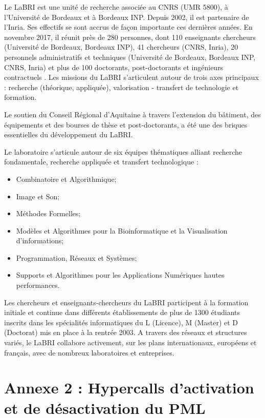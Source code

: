 \noindent Le LaBRI est une unité de recherche associée au CNRS (UMR 5800), à l'Université de Bordeaux et à Bordeaux INP. Depuis 2002, il est partenaire de l'Inria. Ses effectifs se sont accrus de façon importante ces dernières années. En novembre 2017, il réunit près de 280 personnes, dont 110 enseignants chercheurs (Université de Bordeaux, Bordeaux INP), 41 chercheurs (CNRS, Inria), 20 personnels administratifs et techniques (Université de Bordeaux, Bordeaux INP, CNRS, Inria) et plus de 100 doctorants, post-doctorants et ingénieurs contractuels . Les missions du LaBRI s'articulent autour de trois axes principaux : recherche (théorique, appliquée), valorisation - transfert de technologie et formation.

\noindent Le soutien du Conseil Régional d'Aquitaine à travers l'extension du bâtiment, des équipements et des bourses de thèse et post-doctorants, a été une des briques essentielles du développement du LaBRI.

\noindent Le laboratoire s'articule autour de six équipes thématiques alliant recherche fondamentale, recherche appliquée et transfert technologique : 
\begin{itemize}[label=]
    \item Combinatoire et Algorithmique;
    \item Image et Son;
    \item Méthodes Formelles;
    \item Modèles et Algorithmes pour la Bioinformatique et la Visualisation d'informations;
    \item Programmation, Réseaux et Systèmes;
    \item Supports et Algorithmes pour les Applications Numériques hautes performances.
\end{itemize}

\noindent Les chercheurs et enseignants-chercheurs du LaBRI participent à la formation initiale et continue dans différents établissements de plus de 1300 étudiants inscrits dans les spécialités informatiques du L (Licence), M (Master) et D (Doctorat) mis en place à la rentrée 2003. A travers des réseaux et structures variés, le LaBRI collabore activement, sur les plans internationaux, européens et français, avec de nombreux laboratoires et entreprises. 

\section{Annexe 2 : Hypercalls d'activation et de désactivation du PML}
\label{section:enable_disable_logdirty}

